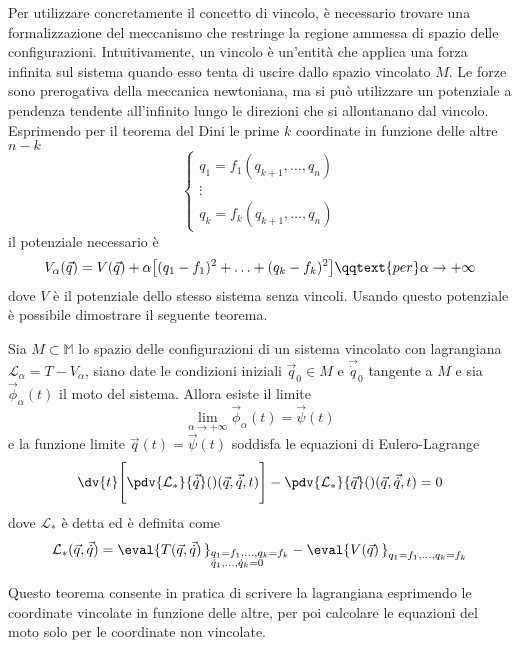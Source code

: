 Per utilizzare concretamente il concetto di vincolo, è necessario trovare una formalizzazione del meccanismo che restringe la regione ammessa di spazio delle configurazioni. Intuitivamente, un vincolo è un'entità che applica una forza infinita sul sistema quando esso tenta di uscire dallo spazio vincolato $M$. Le forze sono prerogativa della meccanica newtoniana, ma si può utilizzare un potenziale a pendenza tendente all'infinito lungo le direzioni che si allontanano dal vincolo. Esprimendo per il teorema del Dini le prime $k$ coordinate in funzione delle altre $n-k$ \begin{equation*}
\begin{cases}
  q_1 = f_1(q_{k+1}, \ldots, q_n) \\
  \vdots \\
  q_k = f_k(q_{k+1}, \ldots, q_n)
\end{cases}
\end{equation*} 
il potenziale necessario è \begin{equation*}
  V_{\alpha}(\vec{q}) = V(\vec{q}) + \alpha\big[(q_1-f_1)^2 + \ldots + (q_k-f_k)^2 \big] \qqtext{per} \alpha \to +\infty
\end{equation*} 
dove $V$ è il potenziale dello stesso sistema senza vincoli. Usando questo potenziale è possibile dimostrare il seguente teorema.
\begin{theorem}
  Sia $M \subset \mathbb{M}$ lo spazio delle configurazioni di un sistema vincolato con lagrangiana $\mathcal{L}_{\alpha} = T -V_{\alpha}$, siano date le condizioni iniziali $\vec{q}_0 \in  M$ e $\vec{\dot{q}}_0$ tangente a $M$ e sia $\vec{\phi}_{\alpha}(t)$ il moto del sistema. Allora esiste il limite \begin{equation*}
  \lim_{\alpha \to +\infty} \vec{\phi}_{\alpha}(t) = \vec{\psi}(t)
  \end{equation*} 
  e la funzione limite $\vec{q}(t) = \vec{\psi}(t)$ soddisfa le equazioni di Eulero-Lagrange \begin{equation*}
    \dv{t}\Bigg[\pdv{\mathcal{L}_{*}}{\vec{\dot{q}}}()(\vec{q},\vec{\dot{q}},t)\Bigg] - \pdv{\mathcal{L}_{*}}{\vec{q}}()(\vec{q},\vec{\dot{q}},t) = 0
  \end{equation*} 
  dove $\mathcal{L}_*$ è detta  ed è definita come \begin{equation*}
  \mathcal{L}_*(\vec{q},\vec{\dot{q}}) = \eval{T(\vec{q},\vec{\dot{q}})\,}_{\begin{subarray}{l}
    q_1=f_1, \ldots, q_k=f_k \\
    \dot{q}_1, \ldots, \dot{q}_k = 0
  \end{subarray}} - \eval{V(\vec{q})\,}_{q_1=f_1, \ldots, q_k=f_k}
  \end{equation*} 
\end{theorem} 
Questo teorema consente in pratica di scrivere la lagrangiana esprimendo le coordinate vincolate in funzione delle altre, per poi calcolare le equazioni del moto solo per le coordinate non vincolate. 

